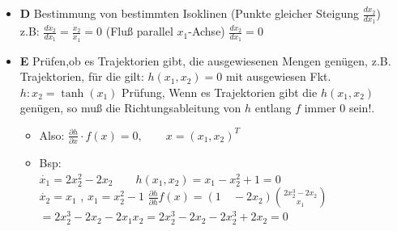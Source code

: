 \documentclass[11pt,a4paper]{article}
\begin{document}
\begin{itemize}
\item{\textbf{D}} Bestimmung von bestimmten Isoklinen (Punkte gleicher Steigung $\frac{dx_{2}}{dx_{1}} $)\\
z.B: $\frac{dx_{2}}{dx_{1}} = \frac{\dot x_2}{\dot x_1} = 0$ (Fluß parallel $x_{1}$-Achse)
$\frac{dx_{2}}{dx_{1}}= 0$ 
\item {\textbf{E}} Prüfen,ob es Trajektorien gibt, die ausgewiesenen Mengen genügen, z.B. Trajektorien, für die gilt: $h(x_{1},x_{2})=0$ mit ausgewiesen Fkt. $h: x_{2}=\tanh{(x_{1})}$
Prüfung, Wenn es Trajektorien gibt die $h(x_{1},x_{2})$ genügen, so muß die Richtungsableitung von $h$ entlang $f$ immer $0$ sein!. 
\begin{itemize}
\item Also: $\frac{\partial{h}}{\partial{x}}\cdot f(x) = 0 , \qquad x=(x_{1}, x_{2})^T$
\item Bsp: \\
$\dot{x_{1}} = 2 x_{2}^2 - 2 x_{2} \qquad h(x_{1}, x_{2}) = x_{1} - x_{2}^2 + 1 = 0$ \\
$\dot{x_{2}} = x_{1} $ , $ x_{1}=x_{2}^2 - 1$
\newline
$\frac{\partial{h}}{\partial{h}} f(x) = (1\quad -2x_{2}) \binom{2 x_2^3 - 2x_2}{x_1}$
$ = 2 x_{2}^3 - 2 x_{2} - 2 x_{1} x_{2} = 2 x_{2}^3 - 2 x_{2} - 2 x_{2}^3 + 2 x_{2} = 0$
\end{itemize}
\end{itemize}
\end{document}
